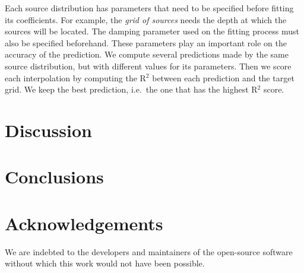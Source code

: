\documentclass[twocolumn]{article}
\begin{document}
Each source distribution has parameters that need to be specified before fitting its
coefficients.
For example, the \emph{grid of sources} needs the depth at which the sources will be
located.
The damping parameter used on the fitting process must also be specified beforehand.
These parameters play an important role on the accuracy of the prediction.
We compute several predictions made by the same source distribution, but with different
values for its parameters.
Then we score each interpolation by computing the R$^2$ between each prediction and the
target grid.
We keep the best prediction, i.e.\ the one that has the highest R$^2$ score.


\section{Discussion}


\section{Conclusions}


\section{Acknowledgements}

We are indebted to the developers and maintainers of the open-source software without
which this work would not have been possible.




\end{document}
